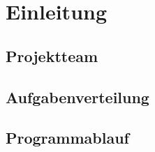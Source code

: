 
\chapter{Einleitung}
\section{Projektteam}
\section{Aufgabenverteilung}
\section{Programmablauf}












